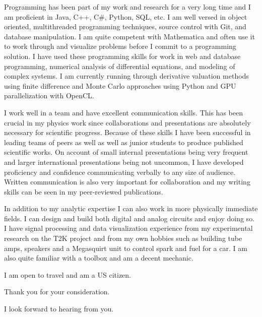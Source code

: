 \documentclass[12pt,a4paper,ariel]{moderncv}        %
\begin{document}
Programming has been part of my work and research for a very long time and I am proficient in Java, C++, C\#, Python, SQL, etc.  I am well versed in object oriented, multithreaded programming techniques, source control with Git, and database manipulation.  I am quite competent with Mathematica and often use it to work through and visualize problems before I commit to a programming solution.  I have used these programming skills for work in web and database programming,  numerical analysis of differential equations, and modeling of complex systems.  I am currently running through derivative valuation methods using finite difference and Monte Carlo approaches using Python and GPU parallelization with OpenCL.

I work well in a team and have excellent communication skills.  This has been crucial in my physics work since collaborations and presentations are absolutely necessary for scientific progress.  Because of these skills I have been successful in leading teams of peers as well as well as junior students to produce published scientific works.  On account of small internal presentations being very frequent and larger international presentations being not uncommon, I have developed proficiency and confidence communicating verbally to any size of audience.  Written communication is also very important for collaboration and my writing skills can be seen in my peer-reviewed publications.

In addition to my analytic expertise I can also work in more physically immediate fields.  I can design and build both digital and analog circuits and enjoy doing so.  I have signal processing and data visualization experience from my experimental research on the T2K project and from my own hobbies such as building tube amps, speakers and a Megasquirt unit to control spark and fuel for a car.  I am also quite familiar with a toolbox and am a decent mechanic.

I am open to travel and am a US citizen.

Thank you for your consideration.

I look forward to hearing from you.

\makeletterclosing
\end{document}
